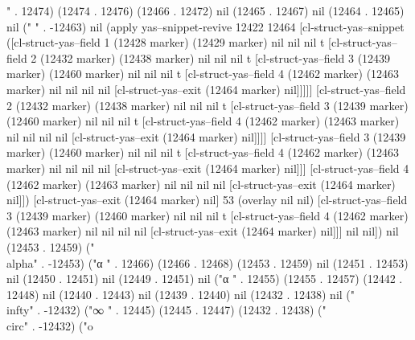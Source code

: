 " . 12474) (12474 . 12476) (12466 . 12472) nil (12465 . 12467) nil (12464 . 12465) nil (" " . -12463) nil (apply yas--snippet-revive 12422 12464 [cl-struct-yas--snippet ([cl-struct-yas--field 1 (12428 marker) (12429 marker) nil nil nil t [cl-struct-yas--field 2 (12432 marker) (12438 marker) nil nil nil t [cl-struct-yas--field 3 (12439 marker) (12460 marker) nil nil nil t [cl-struct-yas--field 4 (12462 marker) (12463 marker) nil nil nil nil [cl-struct-yas--exit (12464 marker) nil]]]]] [cl-struct-yas--field 2 (12432 marker) (12438 marker) nil nil nil t [cl-struct-yas--field 3 (12439 marker) (12460 marker) nil nil nil t [cl-struct-yas--field 4 (12462 marker) (12463 marker) nil nil nil nil [cl-struct-yas--exit (12464 marker) nil]]]] [cl-struct-yas--field 3 (12439 marker) (12460 marker) nil nil nil t [cl-struct-yas--field 4 (12462 marker) (12463 marker) nil nil nil nil [cl-struct-yas--exit (12464 marker) nil]]] [cl-struct-yas--field 4 (12462 marker) (12463 marker) nil nil nil nil [cl-struct-yas--exit (12464 marker) nil]]) [cl-struct-yas--exit (12464 marker) nil] 53 (overlay nil nil) [cl-struct-yas--field 3 (12439 marker) (12460 marker) nil nil nil t [cl-struct-yas--field 4 (12462 marker) (12463 marker) nil nil nil nil [cl-struct-yas--exit (12464 marker) nil]]] nil nil]) nil (12453 . 12459) ("\\alpha" . -12453) ("α
" . 12466) (12466 . 12468) (12453 . 12459) nil (12451 . 12453) nil (12450 . 12451) nil (12449 . 12451) nil ("α
" . 12455) (12455 . 12457) (12442 . 12448) nil (12440 . 12443) nil (12439 . 12440) nil (12432 . 12438) nil ("\\infty" . -12432) ("∞
" . 12445) (12445 . 12447) (12432 . 12438) ("\\circ" . -12432) ("o
